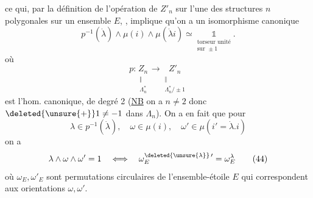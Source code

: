 ce qui, par la définition de l'opération de $Z'_n$ sur l'une des structures $n$ polygonales sur un ensemble $E$, , implique qu'on a un isomorphisme canonique
\[
p^{-1}(\dot\lambda)\wedge\mu(i)\wedge\mu(\dot\lambda i)\simeq
\underset{\substack{\text{torseur unité}\\\text{sur }\pm1}}{\mathbb{1}}.
\tag*{(43)}
\]
où
\[
 p:\underset{\substack{\Vert\\\Lambda_n^*}}{Z_n}\longrightarrow
 \underset{\substack{\Vert\\\Lambda_n^*/\pm1}}{Z'_n}
\]
 est l'hom. canonique,  de degré 2 (\uline{NB} on a  $n\ne2$ donc $\deleted{\unsure{+}}1\ne-1$ dans $\Lambda_n$). On a en fait que pour
\[
\lambda\in p^{-1}(\dot\lambda),\quad \omega\in\mu(i),\quad \omega'\in\mu(i'=\dot\lambda.i)
\]
on a
\[
\lambda\wedge\omega\wedge\omega'=1\quad\Longleftrightarrow\quad
\omega^{\deleted{\unsure{\lambda}}\,\prime}_E=\omega_E^\lambda
\tag*{(44)}
\]
où $\omega_E,\omega'_E$ sont  permutations circulaires de l'ensemble-étoile $E$ qui correspondent aux orientations $\omega,\omega'$.

